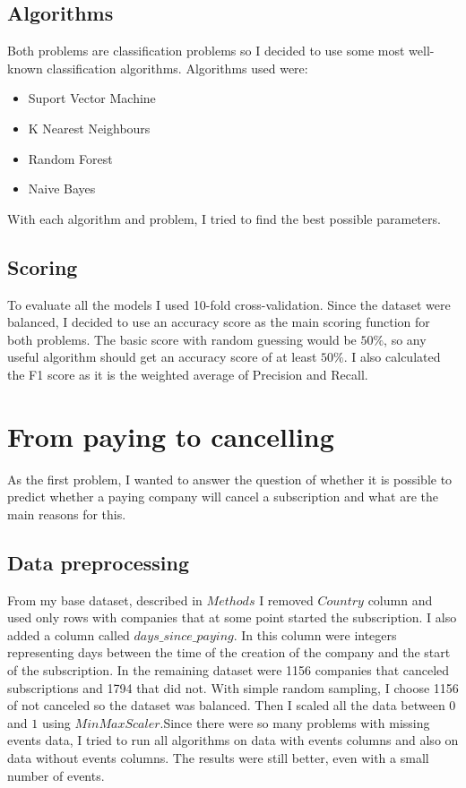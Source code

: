 \documentclass[fleqn,moreauthors,10pt]{ds_report}
\begin{document}
\subsection*{Algorithms}

Both problems are classification problems so I decided to use some most well-known classification algorithms. 
Algorithms used were:
\begin{itemize}
    \item Suport Vector Machine
    \item K Nearest Neighbours
    \item Random Forest
    \item Naive Bayes
\end{itemize}
With each algorithm and problem, I tried to find the best possible parameters. 

\subsection*{Scoring}

To evaluate all the models I used 10-fold cross-validation. Since the dataset were balanced, I decided to use an accuracy score as the main scoring function for both problems. The basic score with random guessing would be $ 50 \% $, so any useful algorithm should get an accuracy score of at least $ 50 \% $. I also calculated the F1 score as it is the weighted average of Precision and Recall. 

\section{From paying to cancelling}
As the first problem, I wanted to answer the question of whether it is possible to predict whether a paying company will cancel a subscription and what are the main reasons for this.

\subsection{Data preprocessing}
From my base dataset, described in $Methods$ I removed $Country$ column and used only rows with companies that at some point started the subscription. I also added a column called $days\_since\_paying$. In this column were integers representing days between the time of the creation of the company and the start of the subscription. In the remaining dataset were 1156 companies that canceled subscriptions and 1794 that did not. With simple random sampling, I choose 1156 of not canceled so the dataset was balanced. Then I scaled all the data  between $0$ and $1$ using $MinMaxScaler$.Since there were so many problems with missing events data, I tried to run all algorithms on data with events columns and also on data without events columns. The results were still better, even with a small number of events.    
\end{document}
